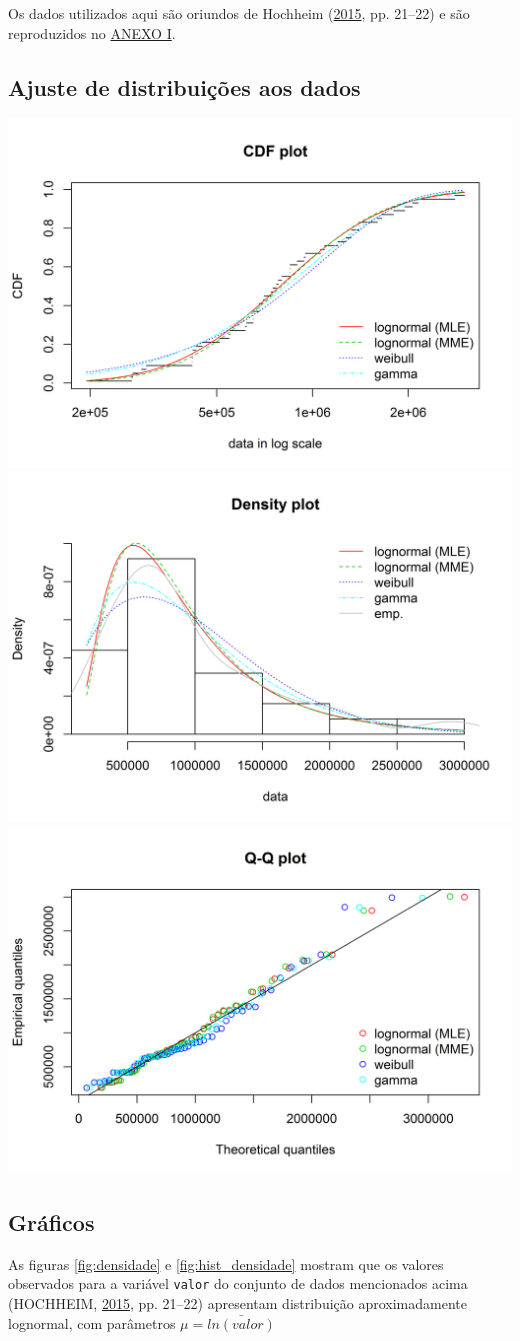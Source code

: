\documentclass[a4paper]{article}
\let\code=\texttt
\begin{document}
Os dados utilizados aqui são oriundos de Hochheim
(\protect\hyperlink{ref-hochheim}{2015}, pp. 21--22) e são reproduzidos
no \protect\hyperlink{anexo-i}{ANEXO I}.

\subsection{Ajuste de distribuições aos
dados}\label{ajuste-de-distribuicoes-aos-dados}

\begin{center}\includegraphics[width=0.49\linewidth]{images/unnamed-chunk-2-1} \includegraphics[width=0.49\linewidth]{images/unnamed-chunk-2-2} \includegraphics[width=0.49\linewidth]{images/unnamed-chunk-2-3} \end{center}

\subsection{Gráficos}\label{graficos}

As figuras \ref{fig:densidade} e \ref{fig:hist_densidade} mostram que os
valores observados para a variável \code{valor} do conjunto de dados
mencionados acima (HOCHHEIM, \protect\hyperlink{ref-hochheim}{2015}, pp.
21--22) apresentam distribuição aproximadamente lognormal, com
parâmetros \(\mu = \bar{ln(valor)}\)
\end{document}

